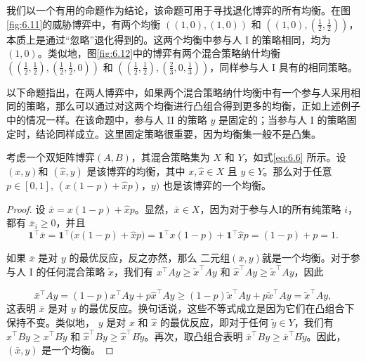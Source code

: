 我们以一个有用的命题作为结论，该命题可用于寻找退化博弈的所有均衡。在图\ref{fig:6.11}的威胁博弈中，有两个均衡 \(\left( {\left( {1,0}\right), \left( {1,0}\right) }\right)\) 和 \(\left( {\left( {1,0}\right), \left( {\frac{1}{2},\frac{1}{2}}\right) }\right)\)，本质上是通过“忽略”退化得到的。这两个均衡中参与人 I 的策略相同，均为 $(1,0)$。类似地，图\ref{fig:6.12}中的博弈有两个混合策略纳什均衡 \(\left( {\left( {\frac{1}{2},\frac{1}{2}}\right), \left( {\frac{1}{2},\frac{1}{2},0}\right) }\right)\) 和 \(\left( {\left( {\frac{1}{2},\frac{1}{2}}\right), \left( {\frac{2}{3},0,\frac{1}{3}}\right) }\right)\)，同样参与人 I 具有的相同策略。

以下命题指出，在两人博弈中，如果两个混合策略纳什均衡中有一个参与人采用相同的策略，那么可以通过对这两个均衡进行凸组合得到更多的均衡，正如上述例子中的情况一样。在该命题中，参与人 II 的策略 \(y\) 是固定的；当参与人 I 的策略固定时，结论同样成立。这里固定策略很重要，因为均衡集一般不是凸集。


\begin{proposition}\label{prop:6.9} %
    考虑一个双矩阵博弈$(A, B)$，其混合策略集为 \(X\) 和 \(Y\)，如式\eqref{eq:6.6} 所示。设$(x, y)$和 \(\left( {\widehat{x},y}\right)\) 是该博弈的均衡，其中 \(x,\widehat{x} \in  X\) 且 \(y \in  Y\)。那么对于任意 \(p \in  \left\lbrack  {0,1}\right\rbrack\), \(\left( {x\left( {1 - p}\right)  + \widehat{x}p}\right)，y)\) 也是该博弈的一个均衡。
\end{proposition}

\begin{proof}
设 \(\bar{x} = x\left( {1 - p}\right)  + \widehat{x}p\)。显然，\(\bar{x} \in  X\)，因为对于参与人I的所有纯策略 \(i\)，都有 \({\bar{x}}_{i} \geq  0\)，并且
\begin{equation}
\label{eq:6.23}
\mathbf{1}^{\top} \bar{x} 
= \mathbf{1}^{\top} \big( x (1-p) + \widehat{x} p \big) 
= \mathbf{1}^{\top} x (1-p) + \mathbf{1}^{\top} \widehat{x} p 
= (1-p) + p = 1.
\end{equation}


如果 \(\bar{x}\) 是对 \(y\) 的最优反应，反之亦然，那么 二元组\(\left( {\bar{x},y}\right)\)就是一个均衡。对于参与人 I 的任何混合策略 \(\widetilde{x}\)，我们有 \({x}^{\top }{Ay} \geq  {\widetilde{x}}^{\top }{Ay}\) 和 \({\widehat{x}}^{\top }{Ay} \geq  {\widetilde{x}}^{\top }{Ay}\)，因此

\[
{\bar{x}}^{\top }{Ay} = \left( {1 - p}\right) {x}^{\top }{Ay} + p{\widehat{x}}^{\top }{Ay} \geq  \left( {1 - p}\right) {\widetilde{x}}^{\top }{Ay} + p{\widetilde{x}}^{\top }{Ay} = {\widetilde{x}}^{\top }{Ay},
\]
这表明 \(\bar{x}\) 是对 \(y\) 的最优反应。换句话说，这些不等式成立是因为它们在凸组合下保持不变。类似地， \(y\) 是对 \(x\) 和 \(\widehat{x}\) 的最优反应，即对于任何 \(\widetilde{y} \in  Y\)，我们有 \({x}^{\top }{By} \geq  {x}^{\top }B\widetilde{y}\) 和 \({\widehat{x}}^{\top }{By} \geq  {\widehat{x}}^{\top }B\widetilde{y}\)。再次，取凸组合表明 \({\bar{x}}^{\top }{By} \geq  {\bar{x}}^{\top }B\widetilde{y}\)。因此，\(\left( {\bar{x},y}\right)\) 是一个均衡。
\end{proof}

